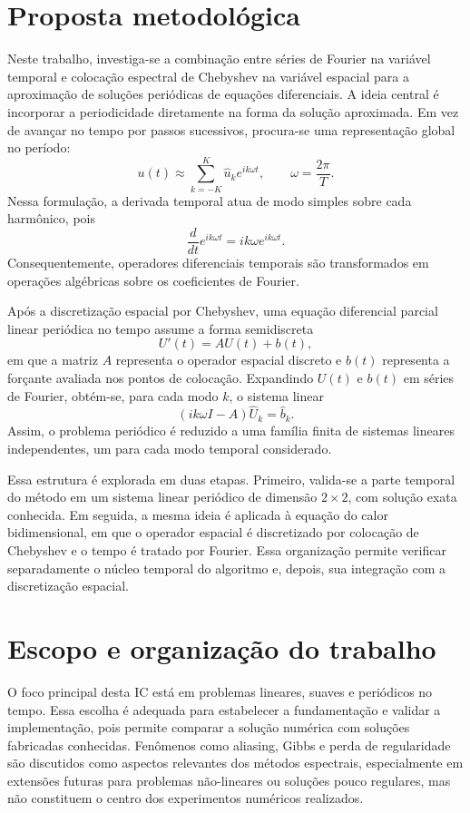 \section{Proposta metodológica}

Neste trabalho, investiga-se a combinação entre séries de Fourier na variável temporal e colocação espectral de Chebyshev na variável espacial para a aproximação de soluções periódicas de equações diferenciais. A ideia central é incorporar a periodicidade diretamente na forma da solução aproximada. Em vez de avançar no tempo por passos sucessivos, procura-se uma representação global no período:
\[
u(t)\approx \sum_{k=-K}^{K}\widehat{u}_k e^{ik\omega t},
\qquad
\omega=\frac{2\pi}{T}.
\]
Nessa formulação, a derivada temporal atua de modo simples sobre cada harmônico, pois
\[
\frac{d}{dt}e^{ik\omega t}=ik\omega e^{ik\omega t}.
\]
Consequentemente, operadores diferenciais temporais são transformados em operações algébricas sobre os coeficientes de Fourier.

Após a discretização espacial por Chebyshev, uma equação diferencial parcial linear periódica no tempo assume a forma semidiscreta
\[
U'(t)=AU(t)+b(t),
\]
em que a matriz \(A\) representa o operador espacial discreto e \(b(t)\) representa a forçante avaliada nos pontos de colocação. Expandindo \(U(t)\) e \(b(t)\) em séries de Fourier, obtém-se, para cada modo \(k\), o sistema linear
\[
(ik\omega I-A)\widehat{U}_k=\widehat{b}_k.
\]
Assim, o problema periódico é reduzido a uma família finita de sistemas lineares independentes, um para cada modo temporal considerado.

Essa estrutura é explorada em duas etapas. Primeiro, valida-se a parte temporal do método em um sistema linear periódico de dimensão \(2\times2\), com solução exata conhecida. Em seguida, a mesma ideia é aplicada à equação do calor bidimensional, em que o operador espacial é discretizado por colocação de Chebyshev e o tempo é tratado por Fourier. Essa organização permite verificar separadamente o núcleo temporal do algoritmo e, depois, sua integração com a discretização espacial.

\section{Escopo e organização do trabalho}

O foco principal desta IC está em problemas lineares, suaves e periódicos no tempo. Essa escolha é adequada para estabelecer a fundamentação e validar a implementação, pois permite comparar a solução numérica com soluções fabricadas conhecidas. Fenômenos como aliasing, Gibbs e perda de regularidade são discutidos como aspectos relevantes dos métodos espectrais, especialmente em extensões futuras para problemas não-lineares ou soluções pouco regulares, mas não constituem o centro dos experimentos numéricos realizados.

